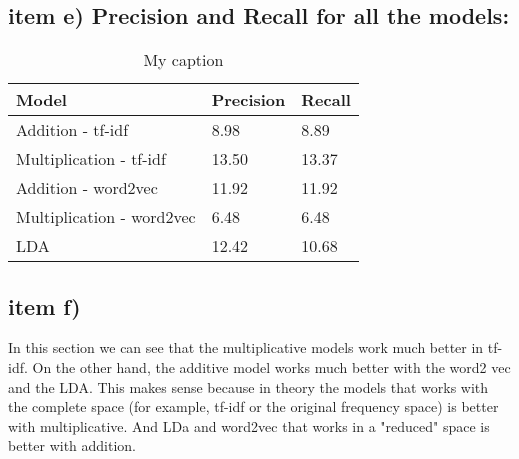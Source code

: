 \documentclass{article}
\begin{document}
\subsection{item e) Precision and Recall for all the models:}
\begin{table}[ht!]
\centering
\caption{My caption}
\label{table1}
\begin{tabular}{|l|ll|}
\hline
Model                     & Precision & Recall \\ \hline
Addition - tf-idf         & 8.98      & 8.89   \\
Multiplication - tf-idf   & 13.50     & 13.37  \\
Addition - word2vec       & 11.92     & 11.92  \\
Multiplication - word2vec & 6.48      & 6.48   \\
LDA                       & 12.42     & 10.68       \\ \hline
\end{tabular}
\end{table}

\subsection{item f)}
In this section we can see that the multiplicative models work much better in tf-idf. On the other hand, the additive model works much better with the word2 vec and the LDA. 
This makes sense because in theory the models that works with the complete space (for example, tf-idf or the original frequency space) is better with multiplicative. And LDa and word2vec that works in a "reduced" space is better with addition. 
\end{document}
